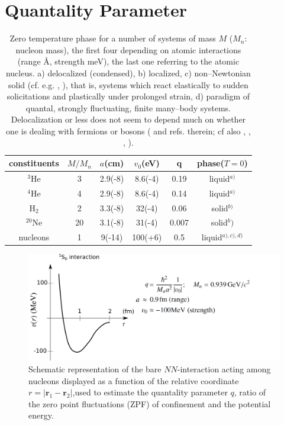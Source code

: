 \section{Quantality Parameter}\label{App1A}
\begin{table}
 \begin{tabular}{|c|c|c|c|c|c|}
 \hline \rule[-2ex]{0pt}{5.5ex}   constituents& $M/M_n$  & $a$(cm) &$v_0$(eV)  &q&phase($T=0$)    \\ 
 \hline \rule[-2ex]{0pt}{5.5ex}   $^{3}$He &3& 2.9(-8)  &8.6(-4)  &0.19  &liquid$^{a)}$    \\ 
 \hline \rule[-2ex]{0pt}{5.5ex}  $^{4}$He  &4&  2.9(-8)&  8.6(-4)&  0.14& liquid$^{a)}$   \\ 
 \hline \rule[-2ex]{0pt}{5.5ex}    H$_2$&2&  3.3(-8)&  32(-4)&  0.06&solid$^{b)}$   \\ 
 \hline \rule[-2ex]{0pt}{5.5ex}    $^{20}$Ne&20& 3.1(-8) &  31(-4)&  0.007&solid$^b)$    \\ 
 \hline \rule[-2ex]{0pt}{5.5ex}    nucleons&1&  9(-14)& 100(+6) &  0.5&liquid$^{a),c),d)}$  \\ 
 \hline 
 \end{tabular}
 \caption{Zero temperature phase for a number of systems of mass $M$ ($M_n$: nucleon mass), the first four depending on atomic interactions (range \AA, strength meV), the last one referring to the atomic nucleus. a) delocalized (condensed), b) localized, c) non--Newtonian solid (cf. e.g. \cite{Bertsch:88b}, \cite{DeGennes:94}), that is, systems which react elastically to sudden solicitations and plastically under prolonged strain, d) paradigm of quantal, strongly fluctuating, finite many--body  systems. Delocalization or less does not seem to depend much on whether one is dealing with fermions or bosons (\cite{Mottelson:02} and refs. therein; cf also \cite{Ebran:14}, \cite{Ebran:14b}, \cite{Ebran:13}, \cite{Ebran:12}).}\label{tab1A1}
 \end{table}
 \begin{figure}
 \centerline{\includegraphics*[width=13cm,angle=0]{nutshell/figs/potential.pdf}}
 \caption{Schematic representation of the bare $NN$-interaction acting among nucleons displayed as a function of the relative coordinate $r=|\mathbf{r}_1-\mathbf{r}_2|$,used to estimate the quantality parameter $q$, ratio of the zero point fluctuations (ZPF) of confinement and the potential energy.}\label{fig1A1}
 \end{figure}
